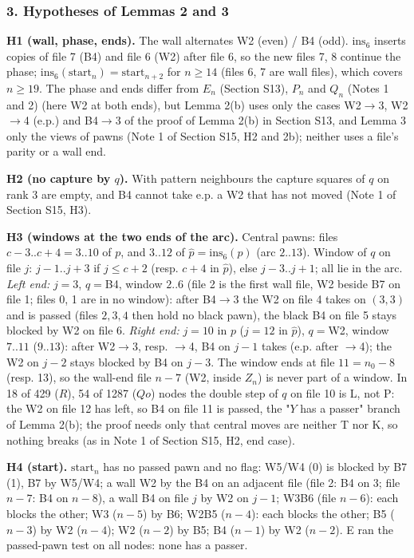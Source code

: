 \subsubsection*{3. Hypotheses of Lemmas 2 and 3}
\textbf{H1 (wall, phase, ends).} The wall alternates W2 (even) / B4 (odd). $\mathrm{ins}_6$ inserts copies of file 7 (B4) and file 6 (W2) after file 6, so the new files 7, 8 continue the phase; $\mathrm{ins}_6(\mathrm{start}_n)=\mathrm{start}_{n+2}$ for $n\ge14$ (files 6, 7 are wall files), which covers $n\ge19$. The phase and ends differ from $E_n$ (Section S13), $P_n$ and $Q_n$ (Notes 1 and 2) (here W2 at both ends), but Lemma 2(b) uses only the cases W2$\to$3, W2$\to$4 (e.p.) and B4$\to$3 of the proof of Lemma 2(b) in Section S13, and Lemma 3 only the views of pawns (Note 1 of Section S15, H2 and 2b); neither uses a file's parity or a wall end.

\textbf{H2 (no capture by $q$).} With pattern neighbours the capture squares of $q$ on rank 3 are empty, and B4 cannot take e.p. a W2 that has not moved (Note 1 of Section S15, H3).

\textbf{H3 (windows at the two ends of the arc).} Central pawns: files $c-3..c+4=3..10$ of $p$, and $3..12$ of $\hat p=\mathrm{ins}_6(p)$ (arc $2..13$). Window of $q$ on file $j$: $j-1..j+3$ if $j\le c+2$ (resp. $c+4$ in $\hat p$), else $j-3..j+1$; all lie in the arc. \emph{Left end:} $j=3$, $q=$B4, window $2..6$ (file 2 is the first wall file, W2 beside B7 on file 1; files 0, 1 are in no window): after B4$\to$3 the W2 on file 4 takes on $(3,3)$ and is passed (files $2,3,4$ then hold no black pawn), the black B4 on file 5 stays blocked by W2 on file 6. \emph{Right end:} $j=10$ in $p$ ($j=12$ in $\hat p$), $q=$W2, window $7..11$ ($9..13$): after W2$\to$3, resp. $\to$4, B4 on $j-1$ takes (e.p. after $\to$4); the W2 on $j-2$ stays blocked by B4 on $j-3$. The window ends at file $11=n_0-8$ (resp. 13), so the wall-end file $n-7$ (W2, inside $Z_n$) is never part of a window. In 18 of 429 ($R$), 54 of 1287 ($Qo$) nodes the double step of $q$ on file 10 is L, not P: the W2 on file 12 has left, so B4 on file 11 is passed, the "$Y$ has a passer" branch of Lemma 2(b); the proof needs only that central moves are neither T nor K, so nothing breaks (as in Note 1 of Section S15, H2, end case).

\textbf{H4 (start).} $\mathrm{start}_n$ has no passed pawn and no flag: W5/W4 (0) is blocked by B7 (1), B7 by W5/W4; a wall W2 by the B4 on an adjacent file (file 2: B4 on 3; file $n-7$: B4 on $n-8$), a wall B4 on file $j$ by W2 on $j-1$; W3B6 (file $n-6$): each blocks the other; W3 ($n-5$) by B6; W2B5 ($n-4$): each blocks the other; B5 ($n-3$) by W2 ($n-4$); W2 ($n-2$) by B5; B4 ($n-1$) by W2 ($n-2$). E ran the passed-pawn test on all nodes: none has a passer.

